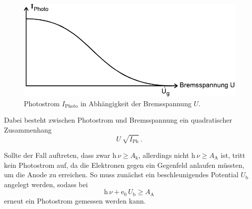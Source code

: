 \begin{figure}[H]
    \centering
    \includegraphics{figures/Abb4.pdf}
    \caption{Photostrom $I_\text{Photo}$ in Abhängigkeit der Bremsspannung $U$.}
    \label{fig:abb4}
\end{figure}

Dabei besteht zwischen Photostrom und Bremsspannung ein quadratischer Zusammenhang
\begin{equation*}
    U ~ \sqrt{I_\text{Ph}} \,.
\end{equation*}

Sollte der Fall auftreten, dass zwar $\text{h} \, \nu \geq A_\text{k}$, allerdings nicht $\text{h} \, \nu \geq A_\text{A}$ ist, tritt kein Photostrom auf, da die Elektronen gegen ein Gegenfeld anlaufen müssten,
um die Anode zu erreichen.
So muss zunächst ein beschleunigendes Potential $U_\text{b}$ angelegt werden, sodass bei
\begin{equation*}
    \text{h} \, \nu + \text{e}_0 \, U_\text{b} \geq A_\text{A}
\end{equation*}
erneut ein Photostrom gemessen werden kann.

